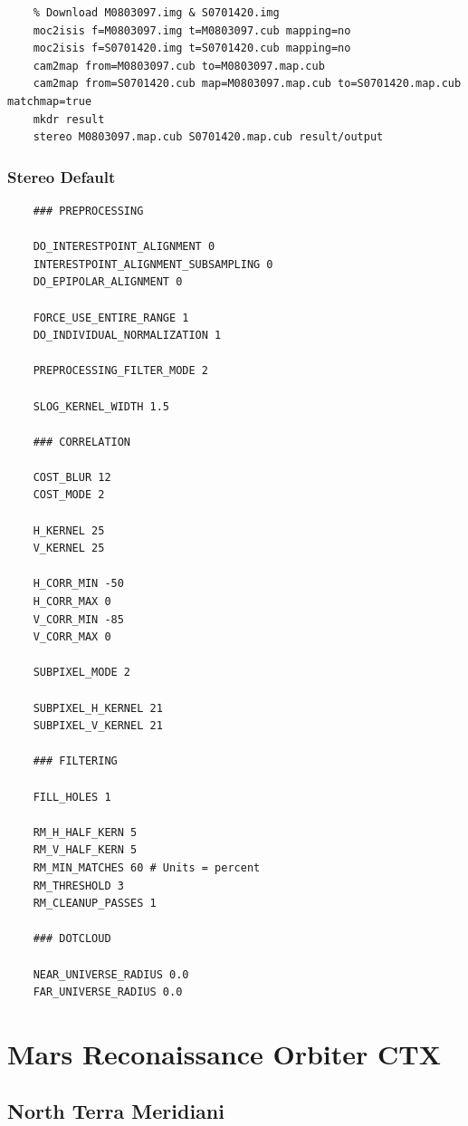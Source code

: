 \begin{verbatim}
    % Download M0803097.img & S0701420.img
    moc2isis f=M0803097.img t=M0803097.cub mapping=no
    moc2isis f=S0701420.img t=S0701420.cub mapping=no
    cam2map from=M0803097.cub to=M0803097.map.cub
    cam2map from=S0701420.cub map=M0803097.map.cub to=S0701420.map.cub matchmap=true
    mkdr result
    stereo M0803097.map.cub S0701420.map.cub result/output
\end{verbatim}

\subsubsection*{Stereo Default}

\begin{verbatim}
    ### PREPROCESSING

    DO_INTERESTPOINT_ALIGNMENT 0
    INTERESTPOINT_ALIGNMENT_SUBSAMPLING 0
    DO_EPIPOLAR_ALIGNMENT 0

    FORCE_USE_ENTIRE_RANGE 1
    DO_INDIVIDUAL_NORMALIZATION 1

    PREPROCESSING_FILTER_MODE 2

    SLOG_KERNEL_WIDTH 1.5

    ### CORRELATION

    COST_BLUR 12
    COST_MODE 2

    H_KERNEL 25
    V_KERNEL 25

    H_CORR_MIN -50
    H_CORR_MAX 0
    V_CORR_MIN -85
    V_CORR_MAX 0

    SUBPIXEL_MODE 2

    SUBPIXEL_H_KERNEL 21
    SUBPIXEL_V_KERNEL 21

    ### FILTERING

    FILL_HOLES 1

    RM_H_HALF_KERN 5
    RM_V_HALF_KERN 5
    RM_MIN_MATCHES 60 # Units = percent
    RM_THRESHOLD 3
    RM_CLEANUP_PASSES 1

    ### DOTCLOUD

    NEAR_UNIVERSE_RADIUS 0.0
    FAR_UNIVERSE_RADIUS 0.0
\end{verbatim}

\section{Mars Reconaissance Orbiter CTX}

\subsection{North Terra Meridiani}

